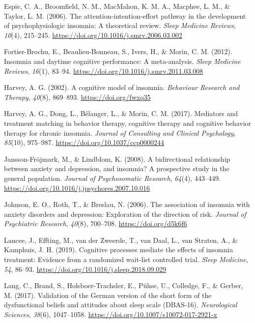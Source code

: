 \documentclass[
  ,doc,11pt, twoside,floatsintext]{apa6}
\newlength{\cslhangindent}
\newlength{\cslentryspacingunit} %
\newenvironment{CSLReferences}[2] %
 {%
  \setlength{\parindent}{0pt}
  \ifodd #1
  \let\oldpar\par
  \def\par{\hangindent=\cslhangindent\oldpar}
  \fi
  \setlength{\parskip}{#2\cslentryspacingunit}
 }%
 {}
\begin{document}
\begin{CSLReferences}{1}{0}
\leavevmode{}%
Espie, C. A., Broomfield, N. M., MacMahon, K. M. A., Macphee, L. M., \& Taylor, L. M. (2006). The attention-intention-effort pathway in the development of psychophysiologic insomnia: A theoretical review. \emph{Sleep Medicine Reviews}, \emph{10}(4), 215--245. \url{https://doi.org/10.1016/j.smrv.2006.03.002}

\leavevmode{}%
Fortier-Brochu, E., Beaulieu-Bonneau, S., Ivers, H., \& Morin, C. M. (2012). Insomnia and daytime cognitive performance: A meta-analysis. \emph{Sleep Medicine Reviews}, \emph{16}(1), 83--94. \url{https://doi.org/10.1016/j.smrv.2011.03.008}

\leavevmode{}%
Harvey, A. G. (2002). A cognitive model of insomnia. \emph{Behaviour Research and Therapy}, \emph{40}(8), 869--893. \url{https://doi.org/fwxq35}

\leavevmode{}%
Harvey, A. G., Dong, L., Bélanger, L., \& Morin, C. M. (2017). Mediators and treatment matching in behavior therapy, cognitive therapy and cognitive behavior therapy for chronic insomnia. \emph{Journal of Consulting and Clinical Psychology}, \emph{85}(10), 975--987. \url{https://doi.org/10.1037/ccp0000244}

\leavevmode{}%
Jansson-Fröjmark, M., \& Lindblom, K. (2008). A bidirectional relationship between anxiety and depression, and insomnia? {A} prospective study in the general population. \emph{Journal of Psychosomatic Research}, \emph{64}(4), 443--449. \url{https://doi.org/10.1016/j.jpsychores.2007.10.016}

\leavevmode{}%
Johnson, E. O., Roth, T., \& Breslau, N. (2006). The association of insomnia with anxiety disorders and depression: Exploration of the direction of risk. \emph{Journal of Psychiatric Research}, \emph{40}(8), 700--708. \url{https://doi.org/d5k6f6}

\leavevmode{}%
Lancee, J., Effting, M., van der Zweerde, T., van Daal, L., van Straten, A., \& Kamphuis, J. H. (2019). Cognitive processes mediate the effects of insomnia treatment: Evidence from a randomized wait-list controlled trial. \emph{Sleep Medicine}, \emph{54}, 86--93. \url{https://doi.org/10.1016/j.sleep.2018.09.029}

\leavevmode{}%
Lang, C., Brand, S., Holsboer-Trachsler, E., Pühse, U., Colledge, F., \& Gerber, M. (2017). Validation of the {German} version of the short form of the dysfunctional beliefs and attitudes about sleep scale ({DBAS-16}). \emph{Neurological Sciences}, \emph{38}(6), 1047--1058. \url{https://doi.org/10.1007/s10072-017-2921-x}


\end{CSLReferences}
\end{document}
